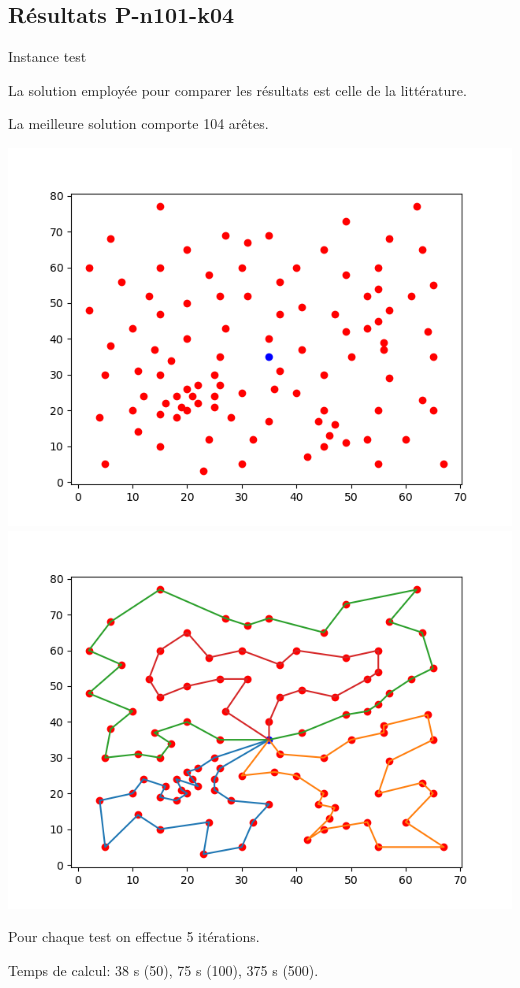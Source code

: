 \documentclass{beamer}
\begin{document}
\subsection{Résultats P-n101-k04}

\begin{frame}{Instance test}

La solution employée pour comparer les résultats est celle de la littérature.

La meilleure solution comporte 104 arêtes.

\includegraphics[scale=0.3]{Instance10104.png}
\includegraphics[scale=0.3]{Solution10104.png}

Pour chaque test on effectue 5 itérations.

Temps de calcul: 38 s (50), 75 s (100), 375 s (500). 
\end{frame}
\end{document}
